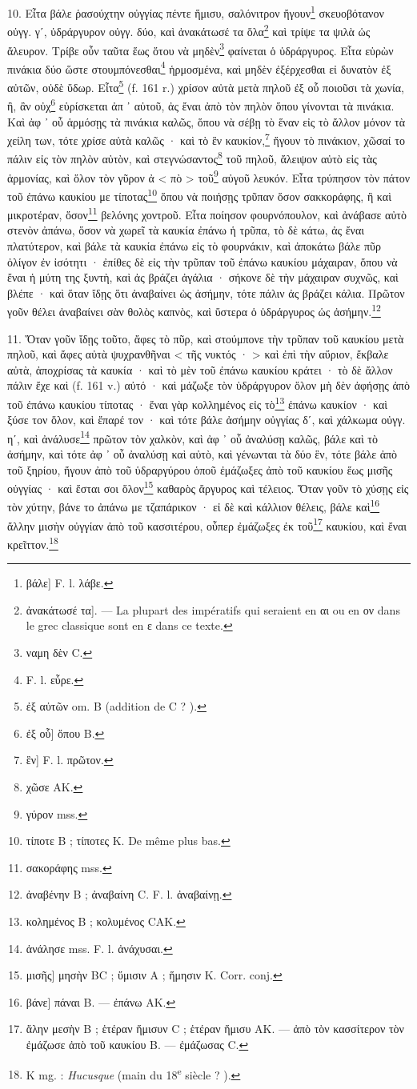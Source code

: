 \documentclass[a4paper, 11pt, oneside, polutonikogreek, french]{article}
\begin{document}
10. Εἶτα βάλε ῥασούχτην οὐγγίας πέντε ἥμισυ, σαλόνιτρον ἤγουν\footnote{βάλε] F. l. λάβε.} σκευοβότανον οὐγγ. γʹ, ὑδράργυρον οὐγγ. δύο, καὶ ἀνακάτωσέ τα ὅλα\footnote{ἀνακάτωσέ τα]. --- La plupart des impératifs qui seraient en αι ou en ον dans le grec classique sont en ε dans ce texte.} καὶ τρίψε τα ψιλὰ ὡς ἄλευρον. Τρίβε οὖν ταῦτα ἕως ὅτου νὰ μηδὲν\footnote{ναμη δὲν C.} φαίνεται ὁ ὑδράργυρος. Εἶτα εὑρὼν πινάκια δύο ὥστε στουμπόνεσθαι\footnote{F. l. εὗρε.} ἡρμοσμένα, καὶ μηδὲν ἐξέρχεσθαι εἰ δυνατὸν ἐξ αὐτῶν, οὐδὲ ὕδωρ. Εἶτα\footnote{ἐξ αὐτῶν om. B (addition de C ? ).} (f. 161 r.) χρίσον αὐτὰ μετὰ πηλοῦ ἐξ οὗ ποιοῦσι τὰ χωνία, ἢ, ἂν οὐχ\footnote{ἐξ οὗ] ὅπου B.} εὑρίσκεται ἀπ ᾽ αὐτοῦ, ἀς ἔναι ἀπὸ τὸν πηλὸν ὅπου γίνονται τὰ πινάκια. Καὶ ἀφ ᾽ οὗ ἁρμόσῃς τὰ πινάκια καλῶς, ὅπου νὰ σέβῃ τὸ ἕναν εἰς τὸ ἄλλον μόνον τὰ χείλη των, τότε χρίσε αὐτὰ καλῶς · καὶ τὸ ἓν καυκίον,\footnote{ἓν] F. l. πρῶτον.} ἤγουν τὸ πινάκιον, χῶσαί το πάλιν εἰς τὸν πηλὸν αὐτὸν, καὶ στεγνώσαντος\footnote{χῶσε AK.} τοῦ πηλοῦ, ἄλειψον αὐτὸ εἰς τὰς ἁρμονίας, καὶ ὅλον τὸν γῦρον ἀ < πὸ > τοῦ\footnote{γύρον mss.} αὐγοῦ λευκόν. Εἶτα τρύπησον τὸν πάτον τοῦ ἐπάνω καυκίου με τίποτας\footnote{τίποτε B ; τίποτες K. De même plus bas.} ὅπου νὰ ποιήσῃς τρῦπαν ὅσον σακκοράφης, ἢ καὶ μικροτέραν, ὅσον\footnote{σακοράφης mss.} βελόνης χοντροῦ. Εἶτα ποίησον φουρνόπουλον, καὶ ἀνάβασε αὐτὸ στενὸν ἀπάνω, ὅσον νὰ χωρεῖ τὰ καυκία ἐπάνω ἡ τρῦπα, τὸ δὲ κάτω, ἀς ἔναι πλατύτερον, καὶ βάλε τὰ καυκία ἐπάνω εἰς τὸ φουρνάκιν, καὶ ἀποκάτω βάλε πῦρ ὀλίγον ἐν ἰσότητι · ἐπίθες δὲ εἰς τὴν τρῦπαν τοῦ ἐπάνω καυκίου μάχαιραν, ὅπου νὰ ἔναι ἡ μύτη της ξυντὴ, καὶ ἀς βράζει ἀγάλια · σήκονε δὲ τὴν μάχαιραν συχνῶς, καὶ βλέπε · καὶ ὅταν ἴδῃς ὅτι ἀναβαίνει ὡς ἀσήμην, τότε πάλιν ἀς βράζει κάλια. Πρῶτον γοῦν θέλει ἀναβαίνει σὰν θολὸς καπνὸς, καὶ ὕστερα ὁ ὑδράργυρος ὡς ἀσήμην.\footnote{ἀναβένην B ; ἀναβαίνη C. F. l. ἀναβαίνῃ.}

11. Ὅταν γοῦν ἴδῃς τοῦτο, ἄφες τὸ πῦρ, καὶ στούμπονε τὴν τρῦπαν τοῦ καυκίου μετὰ πηλοῦ, καὶ ἄφες αὐτὰ ψυχρανθῆναι < τῆς νυκτός · > καὶ ἐπὶ τὴν αὔριον, ἔκβαλε αὐτὰ, ἀποχρίσας τὰ καυκία · καὶ τὸ μὲν τοῦ ἐπάνω καυκίου κράτει · τὸ δὲ ἄλλον πάλιν ἔχε καὶ (f. 161 v.) αὐτό · καὶ μάζωξε τὸν ὑδράργυρον ὅλον μὴ δὲν ἀφήσῃς ἀπὸ τοῦ ἐπάνω καυκίου τίποτας · ἔναι γὰρ κολλημένος εἰς τὸ\footnote{κολημένος B ; κολυμένος CAK.} ἐπάνω καυκίον · καὶ ξύσε τον ὅλον, καὶ ἔπαρέ τον · καὶ τότε βάλε ἀσήμην οὐγγίας δʹ, καὶ χάλκωμα οὐγγ. ηʹ, καὶ ἀνάλυσε\footnote{ἀνάλησε mss. F. l. ἀνάχυσαι.} πρῶτον τὸν χαλκὸν, καὶ ἀφ ᾽ οὗ ἀναλύσῃ καλῶς, βάλε καὶ τὸ ἀσήμην, καὶ τότε ἀφ ᾽ οὗ ἀναλύσῃ καὶ αὐτὸ, καὶ γένωνται τὰ δύο ἓν, τότε βάλε ἀπὸ τοῦ ξηρίου, ἤγουν ἀπὸ τοῦ ὑδραργύρου ὁποῦ ἐμάζωξες ἀπὸ τοῦ καυκίου ἕως μισῆς οὐγγίας · καὶ ἔσται σοι ὅλον\footnote{μισῆς] μησὴν BC ; ὕμισιν A ; ἥμησιν K. Corr. conj.} καθαρὸς ἄργυρος καὶ τέλειος. Ὅταν γοῦν τὸ χύσῃς εἰς τὸν χύτην, βάνε το ἀπάνω με τζαπάρικον · εἰ δὲ καὶ κάλλιον θέλεις, βάλε καὶ\footnote{βάνε] πάναι B. --- ἐπάνω AK.} ἄλλην μισὴν οὐγγίαν ἀπὸ τοῦ κασσιτέρου, οὗπερ ἐμάζωξες ἐκ τοῦ\footnote{ἄλην μεσὴν B ; ἑτέραν ἥμισυν C ; ἑτέραν ἥμισυ AK. --- ἀπὸ τὸν κασσίτερον τὸν ἐμάζωσε ἀπὸ τοῦ καυκίου B. --- ἐμάζωσας C.} καυκίου, καὶ ἔναι κρεῖττον.\footnote{K mg. : \emph{Hucusque} (main du 18\textsuperscript{e} siècle ? ).}
\end{document}
